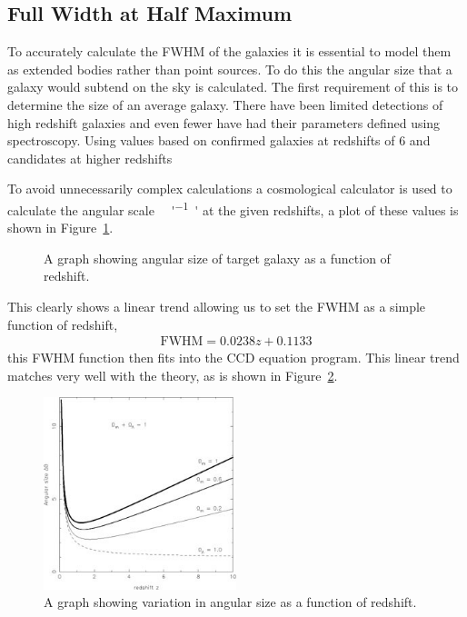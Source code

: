 
\subsection{Full Width at Half Maximum} %
\label{sub:full_width_at_half_maximum}
	To accurately calculate the FWHM of the galaxies it is essential to model them as extended bodies rather than point sources. To do this the angular size that a galaxy would subtend on the sky is calculated. The first requirement of this is to determine the size of an average galaxy. There have been limited detections of high redshift galaxies and even fewer have had their parameters defined using spectroscopy. Using values based on confirmed galaxies at redshifts of 6 and candidates at higher redshifts %

	To avoid unnecessarily complex calculations a cosmological calculator\cite{Ned_Calc} is used to calculate the angular scale \si{\kilo\parsec\per ''} at the given redshifts, a plot of these values is shown in Figure~\ref{fig:redshift_vs_angular_size}.
	\begin{figure}[htbp]
		\centering
			\begingroup{}
				\resizebox{0.6\textwidth}{!}{%
					
				}\endgroup
		\caption{A graph showing angular size of target galaxy as a function of redshift.\label{fig:redshift_vs_angular_size}}
	\end{figure}

	This clearly shows a linear trend allowing us to set the FWHM as a simple function of redshift,
	\begin{align}
		\text{FWHM}= 0.0238z + 0.1133
	\end{align}
	this FWHM function then fits into the CCD equation program. This linear trend matches very well with the theory, as is shown in Figure~\ref{fig:angular_size_function_of_redshift}.
	\begin{figure}[htbp]
		\centering
		\includegraphics[width=0.5\textwidth]{../Images/angular_size_function_of_redshift.jpeg}
		\caption{A graph showing variation in angular size as a function of redshift\cite{Sahni_FWHM}.\label{fig:angular_size_function_of_redshift}}
	\end{figure}

